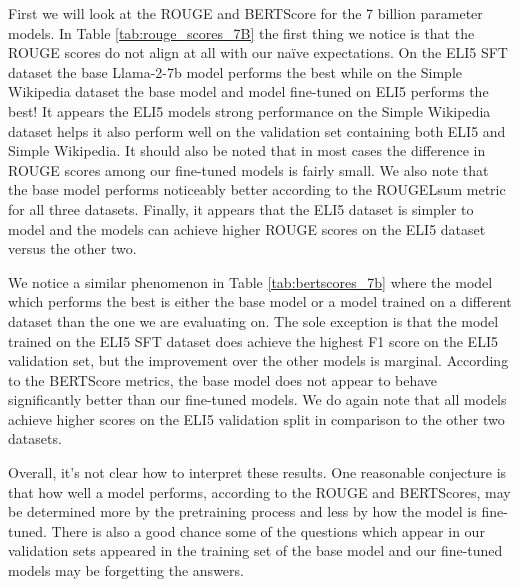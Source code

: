 \documentclass[11pt, oneside]{article}   	%
\begin{document}

First we will look at the ROUGE and BERTScore for the 7 billion parameter models.
In Table \ref{tab:rouge_scores_7B} the first thing we notice is that the ROUGE scores do not align at all with our na\"ive expectations.
On the ELI5 SFT dataset the base Llama-2-7b model performs the best while on the Simple Wikipedia dataset the base model and model fine-tuned on ELI5 performs the best!
It appears the ELI5 models strong performance on the Simple Wikipedia dataset helps it also perform well on the validation set containing both ELI5 and Simple Wikipedia.
It should also be noted that in most cases the difference in ROUGE scores among our fine-tuned models is fairly small.
We also note that the base model performs noticeably better according to the ROUGELsum metric for all three datasets.
Finally, it appears that the ELI5 dataset is simpler to model and the models can achieve higher ROUGE scores on the ELI5 dataset versus the other two.

We notice a similar phenomenon in Table \ref{tab:bertscores_7b} where the model which performs the best is either the base model or a model trained on a different dataset than the one we are evaluating on.
The sole exception is that the model trained on the ELI5 SFT dataset does achieve the highest F1 score on the ELI5 validation set, but the improvement over the other models is marginal.
According to the BERTScore metrics, the base model does not appear to behave significantly better than our fine-tuned models.
We do again note that all models achieve higher scores on the ELI5 validation split in comparison to the other two datasets. 

Overall, it's not clear how to interpret these results.
One reasonable conjecture is that how well a model performs, according to the ROUGE and BERTScores, may be determined more by the pretraining process and less by how the model is fine-tuned.
There is also a good chance some of the questions which appear in our validation sets appeared in the training set of the base model and our fine-tuned models may be forgetting the answers.
\end{document}

